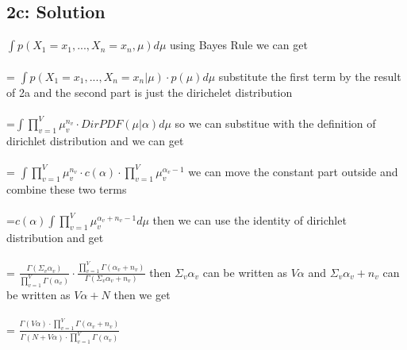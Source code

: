 \documentclass[10pt]{article}
\begin{document}
\subsection{2c: Solution}
$\int p(X_1 = x_1, ..., X_n = x_n, \mu) d\mu$ using Bayes Rule we can get 
\\
\\
= $\int p(X_1 = x_1, ..., X_n = x_n | \mu) \cdot p(\mu) d\mu$ substitute the first term by the result of 2a and the second part is just the dirichelet distribution
\\
\\
=$\int \prod_{v=1}^V \mu_v^{n_v} \cdot DirPDF(\mu | \alpha) d\mu$ so we can substitue with the definition of dirichlet distribution and we can get 
\\
\\
= $\int \prod_{v=1}^V\mu_v^{n_v} \cdot c(\alpha) \cdot \prod_{v=1}^V\mu_v^{\alpha_v-1}$ we can move the constant part outside and combine these two terms 
\\
\\
=$c(\alpha) \int \prod_{v=1}^V \mu_v^{\alpha_v + n_v -1}d\mu$ then we can use the identity of dirichlet distribution and get
\\
\\
= $\frac{\Gamma(\Sigma_v \alpha_v)}{\prod_{v=1}^V\Gamma(\alpha_v)} \cdot \frac{\prod_{v=1}^V\Gamma(\alpha_v + n_v)}{\Gamma(\Sigma_v \alpha_v + n_v)}$ then $\Sigma_v \alpha_v$ can be written as $V\alpha$ and $\Sigma_v \alpha_v + n_v$ can be written as $V\alpha + N$ then we get 
\\
\\
= $\frac{\Gamma(V\alpha) \cdot \prod_{v=1}^V\Gamma(\alpha_v + n_v)}{\Gamma(N+V\alpha) \cdot \prod_{v=1}^V\Gamma(\alpha_v)}$
\end{document}
